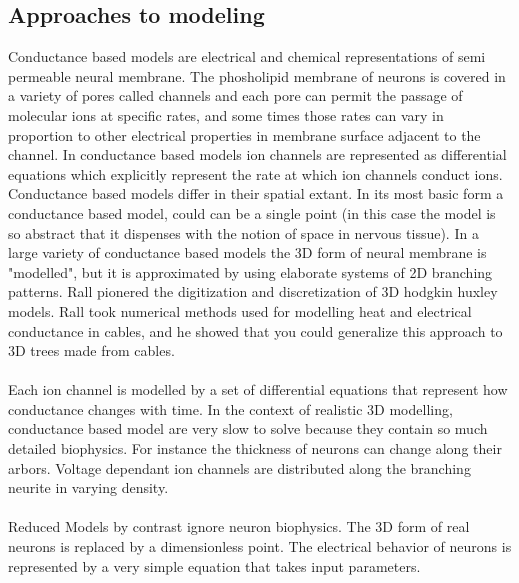 \subsection{Approaches to modeling}
Conductance based models are electrical and chemical representations of semi permeable neural membrane.  The phosholipid membrane of neurons is covered in a variety of pores called channels and each pore can permit the passage of molecular ions at specific rates, and some times those rates can vary in proportion to other electrical properties in membrane surface adjacent to the channel. In conductance based models ion channels are represented as differential equations which explicitly represent the rate at which ion channels conduct ions. Conductance based models differ in their spatial extant. In its most basic form a conductance based model, could can be a single point (in this case the model is so abstract that it dispenses with the notion of space in nervous tissue). In a large variety of conductance based models the 3D form of neural membrane is "modelled", but it is approximated by using elaborate systems of 2D branching patterns. \cite{rall1962electrophysiology} Rall pionered the digitization and discretization of 3D hodgkin huxley models. Rall took numerical methods used for modelling heat and electrical conductance in cables, and he showed that you could generalize this approach to 3D trees made from cables.
\\
\\
Each ion channel is modelled by a set of differential equations that represent how conductance changes with time. In the context of realistic 3D modelling, conductance based model are very slow to solve because they contain so much detailed biophysics. For instance the thickness of neurons can change along their arbors. Voltage dependant ion channels are distributed along the branching neurite in varying density.\\
\\
Reduced Models by contrast ignore neuron biophysics. The 3D form of real neurons is replaced by a dimensionless point. The electrical behavior of neurons is represented by a very simple equation that takes input parameters.


